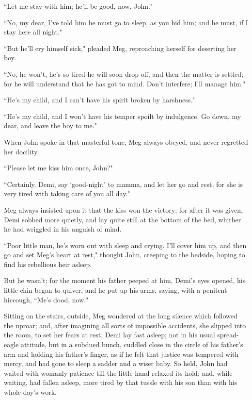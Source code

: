 ``Let me stay with him; he'll be good, now, John."

``No, my dear, I've told him he must go to sleep, as you
bid him; and he must, if I stay here all night."

``But he'll cry himself sick," pleaded Meg, reproaching
herself for deserting her boy.

``No, he won't, he's so tired he will
soon drop off, and then the matter is settled; for he will understand
that he has got to mind. Don't interfere;
I'll manage him."

``He's my child, and I can't have his
spirit broken by harshness."

``He's my child, and I won't have his
temper spoilt by indulgence. Go down, my dear, and leave the boy to me."

When John spoke in that masterful tone, Meg always obeyed, and never
regretted her docility.

``Please let me kiss him once, John?"

``Certainly. Demi, say `good-night' to
mamma, and let her go and rest, for she is very tired with taking care
of you all day."

Meg always insisted upon it that the kiss won the victory; for after it
was given, Demi sobbed more quietly, and lay quite still at the bottom
of the bed, whither he had wriggled in his anguish of mind.

``Poor little man, he's worn out with sleep and crying.
I'll cover him up, and then go and set
Meg's heart at rest," thought John, creeping to the
bedside, hoping to find his rebellious heir asleep.

But he wasn't; for the moment his father peeped at him,
Demi's eyes opened, his little chin began to quiver, and
he put up his arms, saying, with a penitent hiccough,
``Me's dood, now."

Sitting on the stairs, outside, Meg wondered at the long silence which
followed the uproar; and, after imagining all sorts of impossible
accidents, she slipped into the room, to set her fears at rest. Demi lay
fast asleep; not in his usual spread-eagle attitude, but in a subdued
bunch, cuddled close in the circle of his father's arm
and holding his father's finger, as if he felt that
justice was tempered with mercy, and had gone to sleep a sadder and a
wiser baby. So held, John had waited with womanly patience till the
little hand relaxed its hold; and, while waiting, had fallen asleep,
more tired by that tussle with his son than with his whole
day's work.

